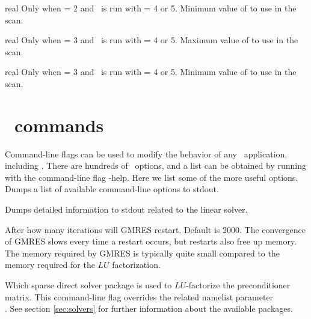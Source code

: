 \myhrule

{real}
{Only when  = 2 and \sfincsScan~is run with  = 4 or 5.}
{Minimum value of  to use in the scan.}

\myhrule

{real}
{Only when  = 3 and \sfincsScan~is run with  = 4 or 5.}
{Maximum value of  to use in the scan.}

\myhrule

{real}
{Only when  = 3 and \sfincsScan~is run with  = 4 or 5.}
{Minimum value of  to use in the scan.}


\section{\PETSc~commands}
\label{sec:PETScCommands}

Command-line flags can be used to modify the behavior of any \PETSc~application, including \sfincs.
There are hundreds of \PETSc~options, and a list can be obtained by running with the command-line flag
{\ttfamily -help}. Here we list some of the more useful options.\\

{Dumps a list of available command-line options to stdout.}

\myhrule

{Dumps detailed information to stdout related to the linear solver.}

\myhrule

{After how many iterations will GMRES restart. Default is 2000. The convergence of GMRES slows every time a restart occurs, but restarts also free up memory.
The memory required by GMRES is typically quite small compared to the memory required for the $LU$ factorization.}

\myhrule

{Which sparse direct solver package is used to $LU$-factorize the preconditioner matrix.
This command-line flag overrides the related namelist parameter\\
.
See section \ref{sec:solvers} for further information about the available packages.
}

